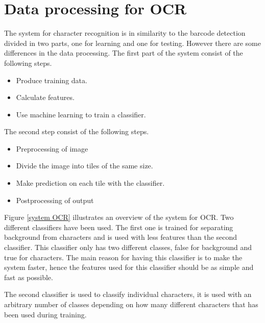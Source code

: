 \chapter{Data processing for OCR}
\label{sec:Data processing for OCR}
The system for character recognition is in similarity to the barcode detection divided in two parts, one for learning and one for testing. However there are some differences in the data processing. The first part of the system consist of the following steps.
\begin{itemize}
	\item Produce training data.
	\item Calculate features.
	\item Use machine learning to train a classifier.
\end{itemize}
The second step consist of the following steps.
\begin{itemize}
	\item Preprocessing of image
	\item Divide the image into tiles of the same size.
	\item Make prediction on each tile with the classifier.
	\item Postprocessing of output
\end{itemize}
Figure \ref{system OCR} illustrates an overview of the system for OCR. Two different classifiers have been used. The first one is trained for separating background from characters and is used with less features than the second classifier. This classifier only has two different classes, false for background and true for characters. The main reason for having this classifier is to make the system faster, hence the features used for this classifier should be as simple and fast as possible.

The second classifier is used to classify individual characters, it is used with an arbitrary number of classes depending on how many different characters that has been used during training.

